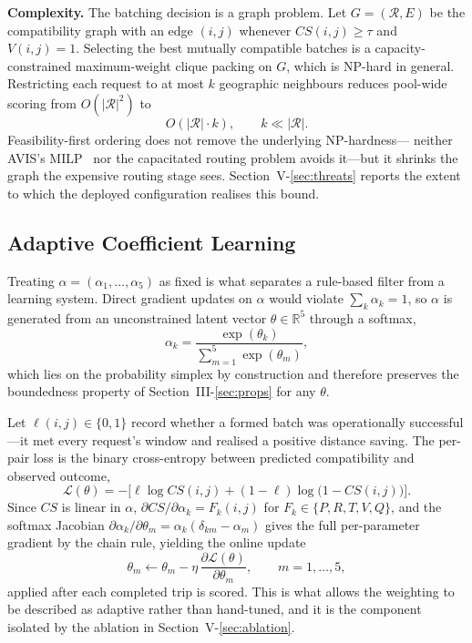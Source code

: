 \documentclass[conference]{IEEEtran}
\begin{document}
\textbf{Complexity.} The batching decision is a graph problem. Let
$G=(\mathcal{R},E)$ be the compatibility graph with an edge $(i,j)$ whenever
$CS(i,j)\ge\tau$ and $V(i,j)=1$. Selecting the best mutually compatible
batches is a capacity-constrained maximum-weight clique packing on $G$, which
is NP-hard in general. Restricting each request to at most $k$ geographic
neighbours reduces pool-wide scoring from $O(|\mathcal{R}|^2)$ to
\begin{equation}
O(|\mathcal{R}|\cdot k),\qquad k\ll|\mathcal{R}| .
\end{equation}
Feasibility-first ordering does not remove the underlying NP-hardness---
neither AVIS's MILP~\cite{zhang2022} nor the capacitated routing problem
avoids it---but it shrinks the graph the expensive routing stage sees.
Section~V-\ref{sec:threats} reports the extent to which the deployed
configuration realises this bound.

\subsection{Adaptive Coefficient Learning}
\label{sec:learn}
Treating $\alpha=(\alpha_1,\dots,\alpha_5)$ as fixed is what separates a
rule-based filter from a learning system. Direct gradient updates on $\alpha$
would violate $\sum_k\alpha_k=1$, so $\alpha$ is generated from an
unconstrained latent vector $\theta\in\mathbb{R}^5$ through a softmax,
\begin{equation}
\alpha_k=\frac{\exp(\theta_k)}{\sum_{m=1}^{5}\exp(\theta_m)},
\end{equation}
which lies on the probability simplex by construction and therefore preserves
the boundedness property of Section~III-\ref{sec:props} for any $\theta$.

Let $\ell(i,j)\in\{0,1\}$ record whether a formed batch was operationally
successful---it met every request's window and realised a positive distance
saving. The per-pair loss is the binary cross-entropy between predicted
compatibility and observed outcome,
\begin{equation}
\mathcal{L}(\theta)=-\bigl[\ell\log CS(i,j)+(1-\ell)\log\bigl(1-CS(i,j)\bigr)\bigr].
\end{equation}
Since $CS$ is linear in $\alpha$, $\partial CS/\partial\alpha_k=F_k(i,j)$ for
$F_k\in\{P,R,T,V,Q\}$, and the softmax Jacobian
$\partial\alpha_k/\partial\theta_m=\alpha_k(\delta_{km}-\alpha_m)$ gives the
full per-parameter gradient by the chain rule, yielding the online update
\begin{equation}
\theta_m\leftarrow\theta_m-\eta\,\frac{\partial\mathcal{L}(\theta)}{\partial\theta_m},
\qquad m=1,\dots,5,
\end{equation}
applied after each completed trip is scored. This is what allows the
weighting to be described as adaptive rather than hand-tuned, and it is the
component isolated by the ablation in Section~V-\ref{sec:ablation}.
\end{document}
